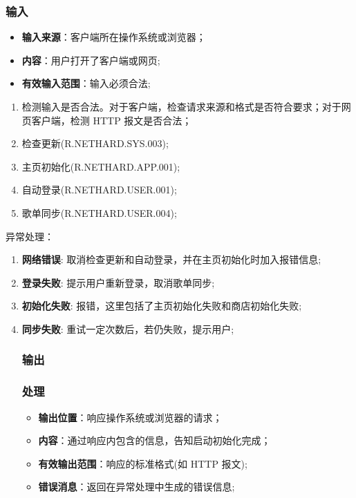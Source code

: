 \subsubsection{输入}
	\begin{itemize}
		\item \textbf{输入来源}：客户端所在操作系统或浏览器；
		\item \textbf{内容}：用户打开了客户端或网页;
		\item \textbf{有效输入范围}：输入必须合法;
	\end{itemize}
\begin{enumerate}
\item 检测输入是否合法。对于客户端，检查请求来源和格式是否符合要求；对于网页客户端，检测 HTTP 报文是否合法；
\item 检查更新(R.NETHARD.SYS.003);
\item 主页初始化(R.NETHARD.APP.001);
\item 自动登录(R.NETHARD.USER.001);
\item 歌单同步(R.NETHARD.USER.004);
\end{enumerate}
\noindent 异常处理：
\begin{enumerate}
\item \textbf{网络错误}: 取消检查更新和自动登录，并在主页初始化时加入报错信息;
\item \textbf{登录失败}: 提示用户重新登录，取消歌单同步;
\item \textbf{初始化失败}: 报错，这里包括了主页初始化失败和商店初始化失败;
  \item \textbf{同步失败}: 重试一定次数后，若仍失败，提示用户;
\subsubsection{输出}
\subsubsection{处理}
\begin{itemize}
	\item \textbf{输出位置}：响应操作系统或浏览器的请求；
	\item \textbf{内容}：通过响应内包含的信息，告知启动初始化完成；
	\item \textbf{有效输出范围}：响应的标准格式(如 HTTP 报文);
	\item \textbf{错误消息}：返回在异常处理中生成的错误信息;
\end{itemize}
\end{enumerate}

